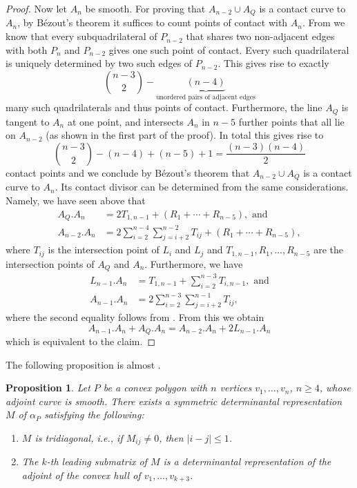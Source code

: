 \documentclass[a4paper,10pt]{amsart}
\theoremstyle{definition}
\theoremstyle{plain}
\newtheorem{prop}[Def]{Proposition}
\begin{document}
\begin{proof}
 Now let $A_n$ be smooth. For proving that  $A_{n-2} \cup A_Q$ is a contact curve to $A_n$, by B\'{e}zout's theorem it suffices to count points of contact with $A_n$. From  we know that every subquadrilateral of $P_{n-2}$ that shares two non-adjacent edges with both $P_n$ and $P_{n-2}$ gives one such point of contact. Every such quadrilateral is uniquely determined by two such edges of $P_{n-2}$. This gives rise to exactly
 \begin{equation*}
     \binom{n-3}{2} - \underbrace{(n-4)}_\textrm{unordered pairs of adjacent edges}
 \end{equation*}
 many such quadrilaterals and thus points of contact.
 Furthermore, the line $A_Q$ is tangent to $A_n$ at one point, and intersects $A_n$ in $n-5$ further points that all lie on $A_{n-2}$ (as shown in the first part of the proof). In total this gives rise to
 \begin{equation*}
     \binom{n-3}{2} - (n-4) + (n-5) + 1 = \frac{(n-3)(n-4)}{2}
 \end{equation*}
 contact points and we conclude by B\'{e}zout's theorem that $A_{n-2} \cup A_Q$ is a contact curve to $A_n$. Its contact divisor can be determined from the same considerations. 
 Namely, we have seen above that
 \begin{align*}
     A_Q.A_n&=2T_{1,n-1}+(R_1+\cdots+R_{n-5}),\textrm{ and}\\
     A_{n-2}.A_n&=2\sum_{i=2}^{n-4}\sum_{j=i+2}^{n-2} T_{ij}+(R_1+\cdots+R_{n-5}),
 \end{align*}
 where $T_{ij}$ is the intersection point of $L_i$ and $L_j$ and $T_{1,n-1},R_1,\ldots,R_{n-5}$ are the intersection points of $A_Q$ and $A_n$. Furthermore, we have
 \begin{align*}
     L_{n-1}.A_n&=T_{1,n-1}+\sum_{i=2}^{n-3}T_{i,n-1},\textrm{ and}\\
     A_{n-1}.A_n&=2\sum_{i=2}^{n-3}\sum_{j=i+2}^{n-1}T_{ij},
 \end{align*}
 where the second equality follows from . From this we obtain
 \begin{equation*}
     A_{n-1}.A_n+A_Q.A_n=A_{n-2}.A_n+2L_{n-1}.A_n
 \end{equation*}
 which is equivalent to the claim.
\end{proof}

The following proposition is almost .

\begin{prop} \label{prop:almostdetrep}
 Let $P$ be a convex polygon with $n$ vertices $v_1, \dots, v_n$, $n\geq4$, whose adjoint curve is smooth. There exists a symmetric determinantal representation $M$ of $\alpha_P$ satisfying the following:
 \begin{enumerate}
     \item $M$ is \emph{tridiagonal}, i.e., if $M_{ij} \neq 0$, then $|i-j| \leq 1$.
     \item The $k$-th leading submatrix of $M$ is a determinantal representation of the adjoint of the convex hull of $v_1, \dots, v_{k+3}$.
 \end{enumerate}
\end{prop}
\end{document}
